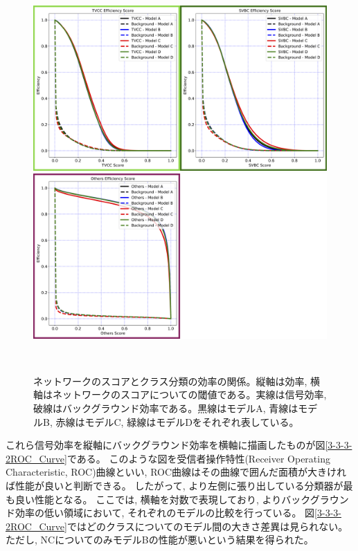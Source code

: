 \begin{figure}[htbp]
 \centering
   \begin{minipage}{1.0\textwidth}
    \centering
    \includegraphics[width=1.0\textwidth, clip]{Figure/3Networks/3-3-3-2Efficiency_Curve_3.png}
   \end{minipage}

   \begin{minipage}{1.0\textwidth}
   \centering
    \includegraphics[width=1.0\textwidth, clip]{Figure/3Networks/3-3-3-2Efficiency_Curve_4.png}
   \end{minipage}
  \caption[ネットワークのスコアとクラス分類の効率の関係]{ネットワークのスコアとクラス分類の効率の関係。縦軸は効率, 横軸はネットワークのスコアについての閾値である。実線は信号効率, 破線はバックグラウンド効率である。黒線はモデルA, 青線はモデルB, 赤線はモデルC, 緑線はモデルDをそれぞれ表している。}
  \label{3-3-3-2Efficiency_Curve}
\end{figure}


これら信号効率を縦軸にバックグラウンド効率を横軸に描画したものが図\ref{3-3-3-2ROC_Curve}である。
このような図を受信者操作特性(Receiver Operating Characteristic, ROC)曲線といい, ROC曲線はその曲線で囲んだ面積が大きければ性能が良いと判断できる。
したがって, より左側に張り出している分類器が最も良い性能となる。
ここでは, 横軸を対数で表現しており, よりバックグラウンド効率の低い領域において, それぞれのモデルの比較を行っている。
図\ref{3-3-3-2ROC_Curve}ではどのクラスについてのモデル間の大きさ差異は見られない。
ただし, NCについてのみモデルBの性能が悪いという結果を得られた。

